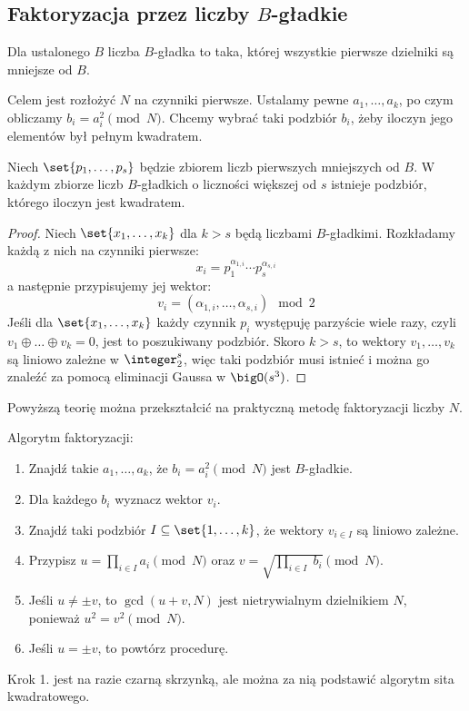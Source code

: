 \subsection{Faktoryzacja przez liczby \( B \)-gładkie}
\begin{definition}
	Dla ustalonego \( B \) liczba \( B \)-gładka to taka, której wszystkie pierwsze dzielniki są mniejsze od \( B \).
\end{definition}

Celem jest rozłożyć \( N \) na czynniki pierwsze. Ustalamy pewne \( a_1, \dots, a_k \), po czym obliczamy \( b_i = a_i^2 \pmod{N} \). Chcemy wybrać taki podzbiór \(b_i \), żeby iloczyn jego elementów był pełnym kwadratem.

\begin{lemma}
	Niech \( \set{p_1, \dots, p_{s}} \) będzie zbiorem liczb pierwszych mniejszych od \( B \). W każdym zbiorze liczb \( B \)-gładkich o liczności większej od \( s \) istnieje podzbiór, którego iloczyn jest kwadratem.
\end{lemma}
\begin{proof}
	Niech \( \set{x_1, \dots, x_k} \) dla \( k > s \) będą liczbami \( B \)-gładkimi. Rozkładamy każdą z nich na czynniki pierwsze:
	\[
		x_i = p_1^{\alpha_{1, i}} \cdots p_s^{\alpha_{s, i}}
	\]
	a następnie przypisujemy jej wektor:
	\[
		v_i = (\alpha_{1, i}, \dots, \alpha_{s, i}) \mod 2
	\]
	Jeśli dla \( \set{x_1, \dots, x_k} \) każdy czynnik \( p_i \) występuję parzyście wiele razy, czyli \( v_1 \oplus \ldots \oplus v_k = 0 \), jest to poszukiwany podzbiór.
	Skoro \( k > s \), to wektory \( v_1, \dots, v_k \) są liniowo zależne w \( \integer_2^{s} \), więc taki podzbiór musi istnieć i można go znaleźć za pomocą eliminacji Gaussa w \( \bigO(s^3) \).
\end{proof}
Powyższą teorię można przekształcić na praktyczną metodę faktoryzacji liczby \( N \).
\begin{greyframe}
	Algorytm faktoryzacji:
	\begin{enumerate}
		\item Znajdź takie \( a_1, \dots, a_k \), że \( b_i = a_i^2 \pmod{N} \) jest \( B \)-gładkie.
		\item Dla każdego \( b_i \) wyznacz wektor \( v_i \).
		\item Znajdź taki podzbiór \( I \subseteq \set{1, \dots, k} \), że wektory \( v_{i \in I} \) są liniowo zależne.
		\item Przypisz \( u = \prod_{i \in I} a_i \pmod{N} \) oraz \( v = \sqrt{\prod_{i \in I}\; b_i} \pmod{N} \).
		\item Jeśli \( u \neq \pm v \), to \( \gcd(u + v, N) \) jest nietrywialnym dzielnikiem \( N \), \\ ponieważ \( u^2 = v^2 \pmod{N} \).
		\item Jeśli \( u = \pm v \), to powtórz procedurę.
	\end{enumerate}
\end{greyframe}
Krok 1. jest na razie czarną skrzynką, ale można za nią podstawić algorytm sita kwadratowego.

